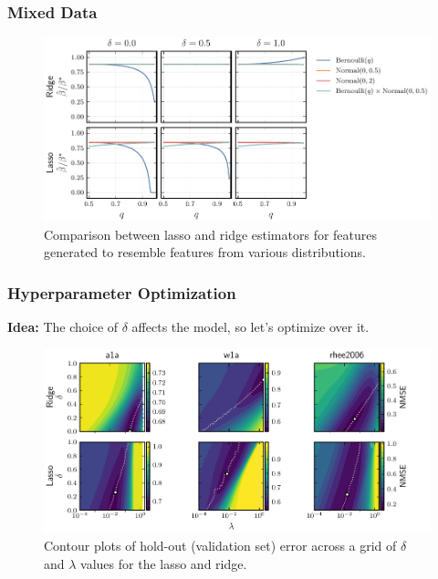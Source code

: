 \documentclass[10pt]{beamer}
\begin{document}
\begin{frame}[c]
  \frametitle{Mixed Data}

  \begin{figure}[htpb]
    \centering
    \includegraphics[width=\textwidth]{figures/mixed_data.pdf}
    \caption{%
      Comparison between lasso and ridge estimators for features generated to resemble features from various distributions.}
  \end{figure}
\end{frame}


\begin{frame}[c]
  \frametitle{Hyperparameter Optimization}

  \textbf{Idea:} The choice of \(\delta\) affects the model, so let's optimize over it.

  \begin{figure}[htpb]
    \centering
    \includegraphics[width=\textwidth]{figures/hyperopt_surfaces.pdf}
    \caption{%
      Contour plots of hold-out (validation set) error across a grid of \(\delta\) and \(\lambda\) values for the
      lasso and ridge.
    }
  \end{figure}

\end{frame}
\end{document}
